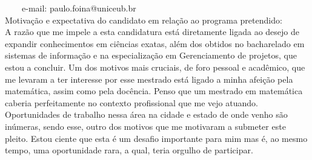 \documentclass[11pt]{article}
\begin{document}
\ \ \ \ e-mail: paulo.foina@uniceub.br
\\[0.2cm]
Motivação e expectativa do candidato em relação ao programa pretendido:
\\A razão que me impele a esta candidatura está diretamente ligada ao desejo de expandir conhecimentos em ciências exatas, além dos obtidos no bacharelado em sistemas de informação e na especialização em Gerenciamento de projetos, que estou a concluir.
Um dos motivos mais cruciais, de foro pessoal e acadêmico, que me levaram a ter interesse por esse mestrado está ligado a minha afeição pela matemática, assim como pela docência.
Penso que um mestrado em matemática caberia perfeitamente no contexto profissional que me vejo atuando. Oportunidades de trabalho nessa área na cidade e estado de onde venho são inúmeras, sendo esse, outro dos motivos que me motivaram a submeter este pleito.
Estou ciente que esta é um desafio importante para mim mas é, ao mesmo tempo, uma oportunidade rara, a qual, teria orgulho de participar.
\end{document}
